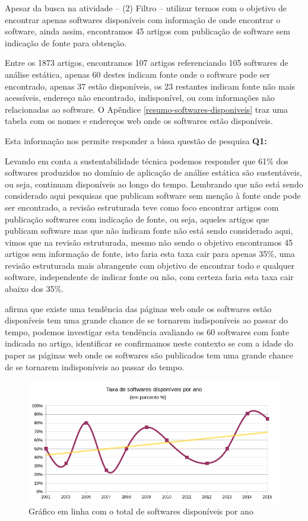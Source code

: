 Apesar da busca na atividade -- (2) Filtro -- utilizar termos com o objetivo de
encontrar apenas softwares disponíveis com informação de onde encontrar o
software, ainda assim, encontramos 45 artigos com publicação de software sem
indicação de fonte para obtenção.

Entre os 1873 artigos, encontramos 107 artigos referenciando 105 softwares de
análise estática, apenas 60 destes indicam fonte onde o software pode ser
encontrado, apenas 37 estão disponíveis, os 23 restantes indicam fonte não mais
acessíveis, endereço não encontrado, indisponível, ou com informações não
relacionadas ao software. O Apêndice \ref{resumo-softwares-disponiveis} traz
uma tabela com os nomes e endereços web onde os softwares estão disponíveis.

Esta informação nos permite responder a bissa questão de pesquisa {\bf Q1:}
\QuestaoUm

Levando em conta a sustentabilidade técnica podemos responder que 61\% dos
softwares produzidos no domínio de aplicação de análise estática são
sustentáveis, ou seja, continuam disponíveis ao longo do tempo. Lembrando que
não está sendo considerado aqui pesquisas que publicam software sem menção à
fonte onde pode ser encontrado, a revisão estruturada teve como foco encontrar
artigos com publicação softwares com indicação de fonte, ou seja, aqueles
artigos que publicam software mas que não indicam fonte não está sendo
considerado aqui, vimos que na revisão estruturada, mesmo não sendo o objetivo
encontramos 45 artigos sem informação de fonte, isto faria esta taxa cair para
apenas 35\%, uma revisão estruturada mais abrangente com objetivo de encontrar
todo e qualquer software, independente de indicar fonte ou não, com certeza
faria esta taxa cair abaixo dos 35\%.

 afirma que existe uma tendência das páginas
web onde os softwares estão disponíveis tem uma grande chance de se tornarem
indisponíveis ao passar do tempo, podemos investigar esta tendência 
avaliando os 60 softwares com fonte indicada no artigo,
identificar se confirmamos neste contexto se com a idade do paper
as páginas web onde os softwares são publicados tem uma grande chance de se
tornarem indisponíveis ao passar do tempo.

\begin{figure}[h]
  \center
  \includegraphics[scale=0.65]{imagens/softwares-disponivel-por-ano.png}
  \caption{Gráfico em linha com o total de softwares disponíveis por ano}
  \label{softwares-disponivel-por-ano}
\end{figure}

